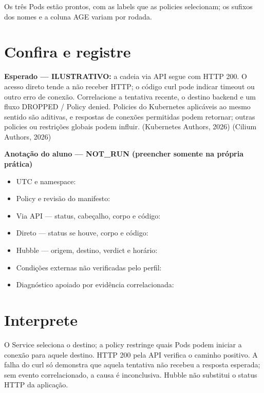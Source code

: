 \documentclass[12pt,openany,oneside,a4paper,chapter=TITLE,english,brazil]{abntex2}
\providecommand{\tightlist}{\setlength{\itemsep}{0pt}\setlength{\parskip}{0pt}}
\begin{document}
Os três Pods estão prontos, com as labels que as policies selecionam; os sufixos dos nomes e a coluna AGE variam por rodada.

\section*{Confira e registre}\label{confira-e-registre-3}

\textbf{Esperado --- ILUSTRATIVO:} a cadeia via API segue com HTTP 200. O acesso direto tende a não receber HTTP; o código curl pode indicar timeout ou outro erro de conexão. Correlacione a tentativa recente, o destino backend e um fluxo DROPPED / Policy denied. Policies do Kubernetes aplicáveis ao mesmo sentido são aditivas, e respostas de conexões permitidas podem retornar; outras policies ou restrições globais podem influir. (Kubernetes Authors, 2026) (Cilium Authors, 2026)

\textbf{Anotação do aluno --- NOT\_RUN (preencher somente na própria prática)}

\begin{itemize}
\tightlist
\item
  UTC e namespace: \hrulefill
\item
  Policy e revisão do manifesto: \hrulefill
\item
  Via API --- status, cabeçalho, corpo e código: \hrulefill
\item
  Direto --- status se houve, corpo e código: \hrulefill
\item
  Hubble --- origem, destino, verdict e horário: \hrulefill
\item
  Condições externas não verificadas pelo perfil: \hrulefill
\item
  Diagnóstico apoiado por evidência correlacionada: \hrulefill
\end{itemize}

\section*{Interprete}\label{interprete-3}

O Service seleciona o destino; a policy restringe quais Pods podem iniciar a conexão para aquele destino. HTTP 200 pela API verifica o caminho positivo. A falha do curl só demonstra que aquela tentativa não recebeu a resposta esperada; sem evento correlacionado, a causa é inconclusiva. Hubble não substitui o status HTTP da aplicação.
\end{document}
